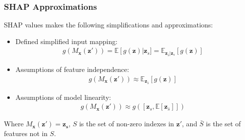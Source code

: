 \begin{frame}\frametitle{SHAP Approximations}
SHAP values makes the following simplifications and approximations:\\
\bigskip
\begin{itemize}
\item Defined simplified input mapping:
	\begin{equation}
	\begin{aligned}	
		g(M_\mathbf{x}(\mathbf{z'})) = \mathbb{E}\left[ g(\mathbf{z})\right | \mathbf{z}_s ] =  \mathbb{E}_{\mathbf{z}_{\bar{s}} | \mathbf{z}_s }\left[ g(\mathbf{z})\right]
	\end{aligned}
	\end{equation}
	
\item Assumptions of feature independence:
	\begin{equation}
	\begin{aligned}	
		g(M_\mathbf{x}(\mathbf{z'})) \approx  \mathbb{E}_{\mathbf{z}_{\bar{s}}}\left[ g(\mathbf{z})\right]
	\end{aligned}
	\end{equation}
\item Assumptions of model linearity:
	\begin{equation}
	\begin{aligned}	
		g(M_\mathbf{x}(\mathbf{z'})) \approx  g(\left[ \mathbf{z}_s, \mathbb{E} \left[\mathbf{z}_{\bar{s}}\right] \right])
	\end{aligned}
	\end{equation}
\end{itemize}
Where $M_\mathbf{x}(\mathbf{z'}) = \mathbf{z_s}$, $S$ is the set of non-zero indexes in $\mathbf{z'}$, and $\bar{S}$ is the set of features not in $S$.

\end{frame}



